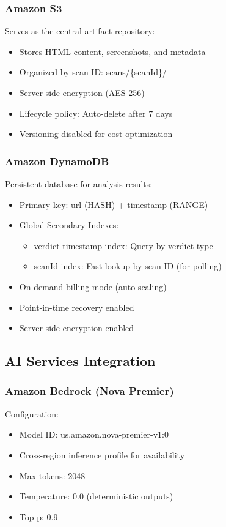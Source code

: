 \documentclass[conference]{IEEEtran}
\begin{document}
\subsubsection{Amazon S3}

Serves as the central artifact repository:
\begin{itemize}
\item Stores HTML content, screenshots, and metadata
\item Organized by scan ID: scans/\{scanId\}/
\item Server-side encryption (AES-256)
\item Lifecycle policy: Auto-delete after 7 days
\item Versioning disabled for cost optimization
\end{itemize}


\subsubsection{Amazon DynamoDB}

Persistent database for analysis results:
\begin{itemize}
\item Primary key: url (HASH) + timestamp (RANGE)
\item Global Secondary Indexes:
  \begin{itemize}
  \item verdict-timestamp-index: Query by verdict type
  \item scanId-index: Fast lookup by scan ID (for polling)
  \end{itemize}
\item On-demand billing mode (auto-scaling)
\item Point-in-time recovery enabled
\item Server-side encryption enabled
\end{itemize}

\subsection{AI Services Integration}

\subsubsection{Amazon Bedrock (Nova Premier)}

Configuration:
\begin{itemize}
\item Model ID: us.amazon.nova-premier-v1:0
\item Cross-region inference profile for availability
\item Max tokens: 2048
\item Temperature: 0.0 (deterministic outputs)
\item Top-p: 0.9
\end{itemize}
\end{document}
